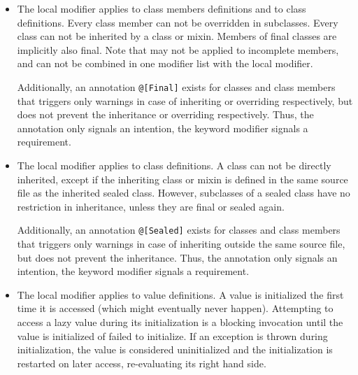 \begin{itemize}
\item
The  local modifier applies to class members definitions and to class definitions. Every  class member can not be overridden in subclasses. Every  class can not be inherited by a class or mixin. Members of final classes are implicitly also final. Note that  may not be applied to incomplete members, and can not be combined in one modifier list with the  local modifier. 

Additionally, an annotation \lstinline!@[Final]! exists for classes and class members that triggers only warnings in case of inheriting or overriding respectively, but does not prevent the inheritance or overriding respectively. Thus, the annotation only signals an intention, the keyword modifier signals a requirement. 

\item
The  local modifier applies to class definitions. A  class can not be directly inherited, except if the inheriting class or mixin is defined in the same source file as the inherited sealed class. However, subclasses of a sealed class have no restriction in inheritance, unless they are final or sealed again. 

Additionally, an annotation \lstinline!@[Sealed]! exists for classes and class members that triggers only warnings in case of inheriting outside the same source file, but does not prevent the inheritance. Thus, the annotation only signals an intention, the keyword modifier signals a requirement. 

\item
The  local modifier applies to value definitions. A  value is initialized the first time it is accessed (which might eventually never happen). Attempting to access a lazy value during its initialization is a blocking invocation until the value is initialized of failed to initialize. If an exception is thrown during initialization, the value is considered uninitialized and the initialization is restarted on later access, re-evaluating its right hand side. 


\end{itemize}
